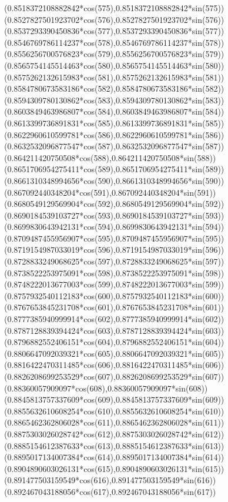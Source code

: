 {({0.8518372108882842*cos(575)},{0.8518372108882842*sin(575)})
({0.8527827501923702*cos(576)},{0.8527827501923702*sin(576)})
({0.8537293390450836*cos(577)},{0.8537293390450836*sin(577)})
({0.8546769786114237*cos(578)},{0.8546769786114237*sin(578)})
({0.8556256700576823*cos(579)},{0.8556256700576823*sin(579)})
({0.8565754145514463*cos(580)},{0.8565754145514463*sin(580)})
({0.8575262132615983*cos(581)},{0.8575262132615983*sin(581)})
({0.8584780673583186*cos(582)},{0.8584780673583186*sin(582)})
({0.8594309780130862*cos(583)},{0.8594309780130862*sin(583)})
({0.8603849463986807*cos(584)},{0.8603849463986807*sin(584)})
({0.8613399736891831*cos(585)},{0.8613399736891831*sin(585)})
({0.8622960610599781*cos(586)},{0.8622960610599781*sin(586)})
({0.8632532096877547*cos(587)},{0.8632532096877547*sin(587)})
({0.864211420750508*cos(588)},{0.864211420750508*sin(588)})
({0.8651706954275411*cos(589)},{0.8651706954275411*sin(589)})
({0.8661310348994656*cos(590)},{0.8661310348994656*sin(590)})
({0.867092440348204*cos(591)},{0.867092440348204*sin(591)})
({0.8680549129569904*cos(592)},{0.8680549129569904*sin(592)})
({0.8690184539103727*cos(593)},{0.8690184539103727*sin(593)})
({0.8699830643942131*cos(594)},{0.8699830643942131*sin(594)})
({0.8709487455956907*cos(595)},{0.8709487455956907*sin(595)})
({0.8719154987033019*cos(596)},{0.8719154987033019*sin(596)})
({0.8728833249068625*cos(597)},{0.8728833249068625*sin(597)})
({0.8738522253975091*cos(598)},{0.8738522253975091*sin(598)})
({0.8748222013677003*cos(599)},{0.8748222013677003*sin(599)})
({0.8757932540112183*cos(600)},{0.8757932540112183*sin(600)})
({0.8767653845231708*cos(601)},{0.8767653845231708*sin(601)})
({0.8777385940999914*cos(602)},{0.8777385940999914*sin(602)})
({0.8787128839394424*cos(603)},{0.8787128839394424*sin(603)})
({0.8796882552406151*cos(604)},{0.8796882552406151*sin(604)})
({0.8806647092039321*cos(605)},{0.8806647092039321*sin(605)})
({0.8816422470311485*cos(606)},{0.8816422470311485*sin(606)})
({0.8826208699253529*cos(607)},{0.8826208699253529*sin(607)})
({0.88360057909097*cos(608)},{0.88360057909097*sin(608)})
({0.8845813757337609*cos(609)},{0.8845813757337609*sin(609)})
({0.8855632610608254*cos(610)},{0.8855632610608254*sin(610)})
({0.8865462362806028*cos(611)},{0.8865462362806028*sin(611)})
({0.8875303026028742*cos(612)},{0.8875303026028742*sin(612)})
({0.8885154612387633*cos(613)},{0.8885154612387633*sin(613)})
({0.8895017134007384*cos(614)},{0.8895017134007384*sin(614)})
({0.8904890603026131*cos(615)},{0.8904890603026131*sin(615)})
({0.891477503159549*cos(616)},{0.891477503159549*sin(616)})
({0.892467043188056*cos(617)},{0.892467043188056*sin(617)})
}
